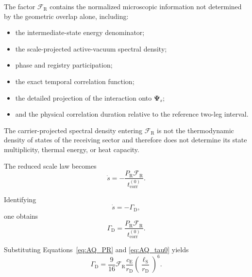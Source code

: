 The factor $\mathcal F_{\mathrm R}$ contains the normalized microscopic
information not determined by the geometric overlap alone, including:

\begin{itemize}
    \item the intermediate-state energy denominator;

    \item the scale-projected active-vacuum spectral density;

    \item phase and registry participation;

    \item the exact temporal correlation function;

    \item the detailed projection of the interaction onto
    $\boldsymbol{\Psi}_s$;

    \item and the physical correlation duration relative to the reference
    two-leg interval.
\end{itemize}

The carrier-projected spectral density entering
$\mathcal F_{\mathrm R}$ is not the thermodynamic density of states of the
receiving sector and therefore does not determine its state multiplicity,
thermal energy, or heat capacity.

The reduced scale law becomes
\begin{equation}
    \dot s
    =
    -
    \frac{
        P_{\mathrm R}
        \mathcal F_{\mathrm R}
    }{
        t_{\mathrm{corr}}^{(0)}
    }.
\end{equation}

Identifying
\begin{equation}
    \dot s
    =
    -\Gamma_{\mathrm D},
\end{equation}
one obtains
\begin{equation}
    \Gamma_{\mathrm D}
    =
    \frac{
        P_{\mathrm R}
        \mathcal F_{\mathrm R}
    }{
        t_{\mathrm{corr}}^{(0)}
    }.
    \label{eq:AQ_gamma_kernel}
\end{equation}

Substituting Equations~\eqref{eq:AQ_PR} and
\eqref{eq:AQ_tau0} yields
\begin{equation}
    \boxed{
    \Gamma_{\mathrm D}
    =
    \frac{9}{16}
    \mathcal F_{\mathrm R}
    \frac{c_{\mathrm E}}{r_{\mathrm D}}
    \left(
        \frac{\ell_{\mathrm S}}{r_{\mathrm D}}
    \right)^6.
    }
    \label{eq:AQ_gamma_final}
\end{equation}

